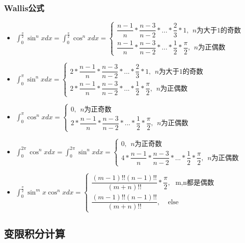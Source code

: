 \subsubsection{Wallis公式}
\begin{itemize}
    \item \(\displaystyle\int_0^{\frac{\pi}{2}}\sin^nxdx = \int_0^{\frac{\pi}{2}}\cos^nxdx = \begin{cases}
        \dfrac{n - 1}{n} * \dfrac{n - 3}{n - 2} * ... * \dfrac{2}{3} * 1,\ \ n\text{为大于1的奇数} \\ 
        \dfrac{n - 1}{n} * \dfrac{n - 3}{n - 2} * ... * \dfrac{1}{2} * \dfrac{\pi}{2},\ \ n\text{为正偶数}
    \end{cases}\)
    \item \(\displaystyle\int_0^\pi\sin^nxdx = \begin{cases}
        2 * \dfrac{n - 1}{n} * \dfrac{n - 3}{n - 2} * ... * \dfrac{2}{3} * 1,\ \ n\text{为大于1的奇数} \\ 
        2 * \dfrac{n - 1}{n} * \dfrac{n - 3}{n - 2} * ... * \dfrac{1}{2} * \dfrac{\pi}{2},\ \ n\text{为正偶数}
    \end{cases}\)
    \item \(\displaystyle\int_0^\pi\cos^nxdx = \begin{cases}
        0, \ \ n\text{为正奇数} \\ 
        2 * \dfrac{n - 1}{n} * \dfrac{n - 3}{n - 2} * ... * \dfrac{1}{2} * \dfrac{\pi}{2},\ \ n\text{为正偶数}
    \end{cases}\)
    \item \(\displaystyle\int_0^{2\pi}\cos^nxdx = \int_0^{2\pi}\sin^nxdx = \begin{cases}
        0,\ \  n\text{为正奇数} \\ 
        4 * \dfrac{n - 1}{n} * \dfrac{n - 3}{n - 2} * ... * \dfrac{1}{2} * \dfrac{\pi}{2},\ \ n\text{为正偶数}
    \end{cases}\)
    \item \(\displaystyle\int_0^{\frac{\pi}{2}}\sin^mx\cos^nxdx = \begin{cases}
        \dfrac{(m - 1)!!(n - 1)!!}{(m + n)!!} * \dfrac{\pi}{2},\ \ \ \text{m,n都是偶数} \\ 
        \dfrac{(m - 1)!!(n - 1)!!}{(m + n)!!},\ \ \ \ \ \text{else}
    \end{cases}\)
\end{itemize}


\subsection{变限积分计算}

